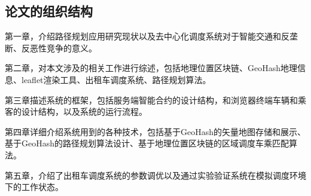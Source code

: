 \subsection{论文的组织结构}
第一章，介绍路径规划应用研究现状以及去中心化调度系统对于智能交通和反垄断、反恶性竞争的意义。\par
第二章，对本文涉及的相关工作进行综述，包括地理位置区块链、GeoHash地理信息、leaflet渲染工具、出租车调度系统、路径规划算法。\par
第三章描述系统的框架，包括服务端智能合约的设计结构，和浏览器终端车辆和乘客的设计结构，以及系统的运行流程。\par
第四章详细介绍系统用到的各种技术，包括基于GeoHash的矢量地图存储和展示、基于GeoHash的路径规划算法设计、基于地理位置区块链的区域调度车乘匹配算法。\par
第五章，介绍了出租车调度系统的参数调优以及通过实验验证系统在模拟调度环境下的工作状态。